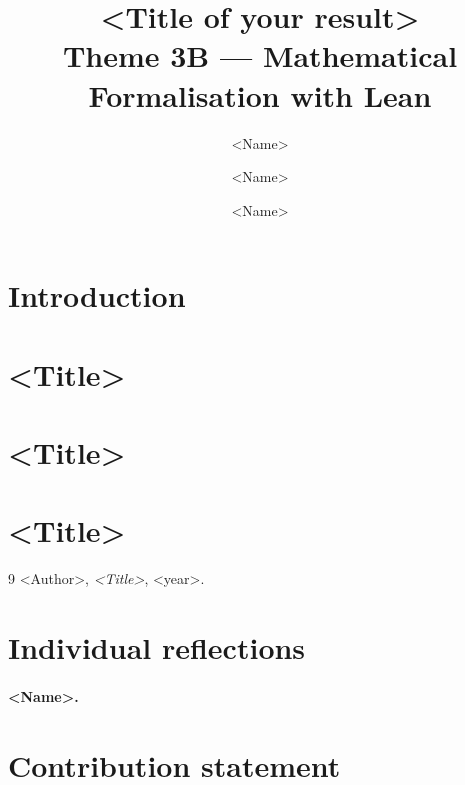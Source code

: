 \documentclass[11pt,a4paper]{article}
\title{\textbf{<Title of your result>}\\[0.3em]
  \normalsize Theme 3B --- Mathematical Formalisation with Lean}
\author{<Name> \and <Name> \and <Name>}
\date{}
\begin{document}
\maketitle


\section{Introduction}

\section{<Title>}

\section{<Title>}

\section{<Title>}

\begin{thebibliography}{9}
 <Author>, \emph{<Title>}, <year>.
\end{thebibliography}


\section{Individual reflections}

\paragraph{<Name>.} %

\appendix

\section{Contribution statement}
\end{document}
